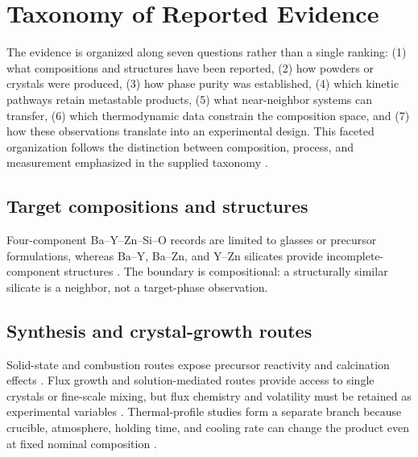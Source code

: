 \section{Taxonomy of Reported Evidence}

The evidence is organized along seven questions rather than a single ranking: (1) what compositions and structures have been reported, (2) how powders or crystals were produced, (3) how phase purity was established, (4) which kinetic pathways retain metastable products, (5) what near-neighbor systems can transfer, (6) which thermodynamic data constrain the composition space, and (7) how these observations translate into an experimental design. This faceted organization follows the distinction between composition, process, and measurement emphasized in the supplied taxonomy \cite{chen2024navigating,wang2024optimal,arroyave2022phase}.

\subsection{Target compositions and structures}

Four-component Ba--Y--Zn--Si--O records are limited to glasses or precursor formulations, whereas Ba--Y, Ba--Zn, and Y--Zn silicates provide incomplete-component structures \cite{kozhevnikova2024synthesis,kaur2011influence,sayyed2026physical,kolitsch2006bay2si3o10,kaiser2002crystal,bordun2011cathodoluminescence}. The boundary is compositional: a structurally similar silicate is a neighbor, not a target-phase observation.

\subsection{Synthesis and crystal-growth routes}

Solid-state and combustion routes expose precursor reactivity and calcination effects \cite{shen2019synthesis,faat2023enhanced,richhariya2021synthesis,takesue2009thermal}. Flux growth and solution-mediated routes provide access to single crystals or fine-scale mixing, but flux chemistry and volatility must be retained as experimental variables \cite{bugaris2012materials,goncalves2025flux,kumar1974growth,smith1974flux,ranganathan2008sol,parsa2018synthesis}. Thermal-profile studies form a separate branch because crucible, atmosphere, holding time, and cooling rate can change the product even at fixed nominal composition \cite{thieme2022noble,xu2020crystallization,shaaban2021thermal,zheng2025effect}.

